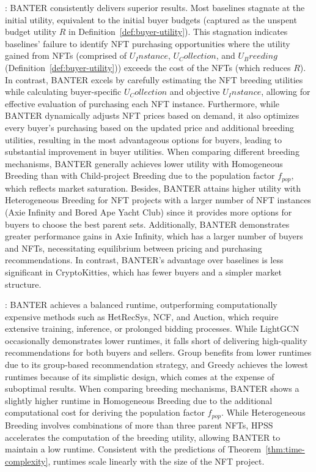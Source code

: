\documentclass[conference]{IEEEtran}
\theoremstyle{plain}
\begin{document}
\noindentUtility: BANTER consistently delivers superior results. Most baselines stagnate at the initial utility, equivalent to the initial buyer budgets (captured as the unspent budget utility $R$ in Definition~\ref{def:buyer-utility}). This stagnation indicates baselines' failure to identify NFT purchasing opportunities where the utility gained from NFTs (comprised of $U_Instance$, $U_Collection$, and $U_Breeding$ (Definition~\ref{def:buyer-utility})) exceeds the cost of the NFTs (which reduces $R$). In contrast, BANTER excels by carefully estimating the NFT breeding utilities while calculating buyer-specific $U_Collection$ and objective $U_Instance$, allowing for effective evaluation of purchasing each NFT instance. Furthermore, while BANTER dynamically adjusts NFT prices based on demand, it also optimizes every buyer's purchasing based on the updated price and additional breeding utilities, resulting in the most advantageous options for buyers, leading to substantial improvement in buyer utilities. When comparing different breeding mechanisms, BANTER generally achieves lower utility with Homogeneous Breeding than with Child-project Breeding due to the population factor $f_{pop}$, which reflects market saturation. Besides, BANTER attains higher utility with Heterogeneous Breeding for NFT projects with a larger number of NFT instances (Axie Infinity and Bored Ape Yacht Club) since it provides more options for buyers to choose the best parent sets. Additionally, BANTER demonstrates greater performance gains in Axie Infinity, which has a larger number of buyers and NFTs, necessitating equilibrium between pricing and purchasing recommendations. In contrast, BANTER's advantage over baselines is less significant in CryptoKitties, which has fewer buyers and a simpler market structure.

\noindentRuntime: BANTER achieves a balanced runtime, outperforming computationally expensive methods such as HetRecSys, NCF, and Auction, which require extensive training, inference, or prolonged bidding processes. While LightGCN occasionally demonstrates lower runtimes, it falls short of delivering high-quality recommendations for both buyers and sellers. Group benefits from lower runtimes due to its group-based recommendation strategy, and Greedy achieves the lowest runtimes because of its simplistic design, which comes at the expense of suboptimal results. When comparing breeding mechanisms, BANTER shows a slightly higher runtime in Homogeneous Breeding due to the additional computational cost for deriving the population factor $f_{pop}$. While Heterogeneous Breeding involves combinations of more than three parent NFTs, HPSS accelerates the computation of the breeding utility, allowing BANTER to maintain a low runtime. Consistent with the predictions of Theorem~\ref{thm:time-complexity}, runtimes scale linearly with the size of the NFT project. 
\end{document}
